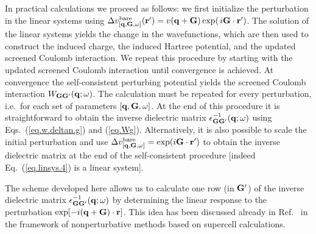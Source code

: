 \documentclass[twocolumn,prb,showpacs,superscriptaddress]{revtex4}
\def\w{\omega}
\def\H{\hat{H}}
\def\P{\hat{P}_{\rm occ}}
\def\E{\varepsilon}
\def\q{{\bf q}}
\def\k{{\bf k}}
\def\G{{\bf G}}
\def\Gp{{\bf G^\prime}}
\def\r{{\bf r}}
\def\rp{{\bf r^\prime}}
\begin{document}
In practical calculations we proceed as follows: we first initialize the perturbation
in the linear systems using 
$\Delta v^{\rm bare}_{[\q,\G,\w]}(\rp) = v(\q+\G) \, {\rm exp}(\,i\G\cdot\rp)$.
The solution of the linear systems yields the change in the wavefunctions,
which are then used to construct the induced charge, the induced Hartree potential,
and the updated screened Coulomb interaction. We repeat this procedure by starting with
the updated screened Coulomb interaction until convergence is achieved.
At convergence the self-consistent perturbing potential yields
the screened Coulomb interaction $W_{\G\Gp}(\q;\w)$.
The calculation must be repeated for every perturbation, i.e.\ for
each set of parameters $[\q,\G,\w]$.
%
At the end of this procedure it is straightforward to obtain the inverse dielectric matrix 
$\epsilon^{-1}_{\G\Gp}(\q;\w)$ using Eqs.~(\ref{eq.w.deltan.g}) and 
(\ref{eq.Wg}). Alternatively, it is also possible to scale the initial
perturbation and use $\Delta v^{\rm bare}_{[\q,\G,\w]} = {\rm exp}(i\G\cdot\rp)$
to obtain the inverse dielectric matrix at the end of the self-consistent procedure
[indeed Eq.~(\ref{eq.linsys.4}) is a linear system].

The scheme developed here allows us to calculate one row (in $\Gp$) of the inverse 
dielectric matrix $\epsilon^{-1}_{\G\Gp}(\q;\w)$ by determining the linear response to the
perturbation ${\rm exp}[-i(\q+\G)\cdot\r]$. This idea has been discussed already
in Ref.\  in the framework of nonperturbative methods
based on supercell calculations.

\end{document}
